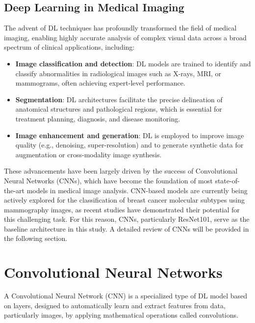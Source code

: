 \documentclass[a4paper,10pt]{book}
\begin{document}
\subsection{Deep Learning in Medical Imaging}

The advent of DL techniques has profoundly transformed the field of medical imaging, enabling highly accurate analysis of complex visual data across a broad spectrum of clinical applications, including:

\begin{itemize}
    \item \textbf{Image classification and detection}: DL models are trained to identify and classify abnormalities in radiological images such as X-rays, MRI, or mammograms, often achieving expert-level performance.
    \item \textbf{Segmentation}: DL architectures facilitate the precise delineation of anatomical structures and pathological regions, which is essential for treatment planning, diagnosis, and disease monitoring.
    \item \textbf{Image enhancement and generation}: DL is employed to improve image quality (e.g., denoising, super-resolution) and to generate synthetic data for augmentation or cross-modality image synthesis.
\end{itemize}

These advancements have been largely driven by the success of Convolutional Neural Networks (CNNs), which have become the foundation of most state-of-the-art models in medical image analysis. CNN-based models are currently being actively explored for the classification of breast cancer molecular subtypes using mammography images, as recent studies have demonstrated their potential for this challenging task\cite{mota_breast_2024, ben_rabah_multimodal_2025}. For this reason, CNNs, particularly ResNet101, serve as the baseline architecture in this study. A detailed review of CNNs will be provided in the following section.



\section{Convolutional Neural Networks}

A Convolutional Neural Network (CNN) is a specialized type of DL model based on layers, designed to automatically learn and extract features from data, particularly images, by applying mathematical operations called convolutions. 
\end{document}
